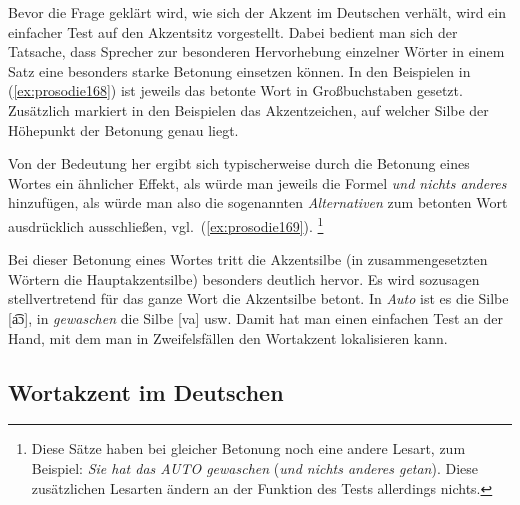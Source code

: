 \begin{exe}
\end{exe}

Bevor die Frage geklärt wird, wie sich der Akzent im Deutschen verhält, wird ein einfacher Test auf den Akzentsitz vorgestellt.
Dabei bedient man sich der Tatsache, dass Sprecher zur besonderen Hervorhebung einzelner Wörter in einem Satz eine besonders starke Betonung einsetzen können.
In den Beispielen in (\ref{ex:prosodie168}) ist jeweils das betonte Wort in Großbuchstaben gesetzt.
Zusätzlich markiert in den Beispielen das Akzentzeichen, auf welcher Silbe der Höhepunkt der Betonung genau liegt.

\begin{exe}
  \ex\label{ex:prosodie168}
  \begin{xlist}
  \end{xlist}
\end{exe}

Von der Bedeutung her ergibt sich typischerweise durch die Betonung eines Wortes ein ähnlicher Effekt, als würde man jeweils die Formel \textit{und nichts anderes} hinzufügen, als würde man also die sogenannten \textit{Alternativen} zum betonten Wort ausdrücklich ausschließen, vgl.\ (\ref{ex:prosodie169}).%
\footnote{Diese Sätze haben bei gleicher Betonung noch eine andere Lesart, zum Beispiel:
\textit{Sie hat das AUTO gewaschen }(\textit{und nichts anderes getan}).
Diese zusätzlichen Lesarten ändern an der Funktion des Tests allerdings nichts.}

\begin{exe}
  \ex\label{ex:prosodie169}
  \begin{xlist}
  \end{xlist}
\end{exe}

Bei dieser Betonung eines Wortes tritt die Akzentsilbe (in zusammengesetzten Wörtern die Hauptakzentsilbe) besonders deutlich hervor.
Es wird sozusagen stellvertretend für das ganze Wort die Akzentsilbe betont.
In \textit{Auto} ist es die Silbe [a͡ɔ], in \textit{gewaschen} die Silbe [va] usw.
Damit hat man einen einfachen Test an der Hand, mit dem man in Zweifelsfällen den Wortakzent lokalisieren kann.

\subsection{Wortakzent im Deutschen}
\label{sec:wortakzentimdeutschen}

